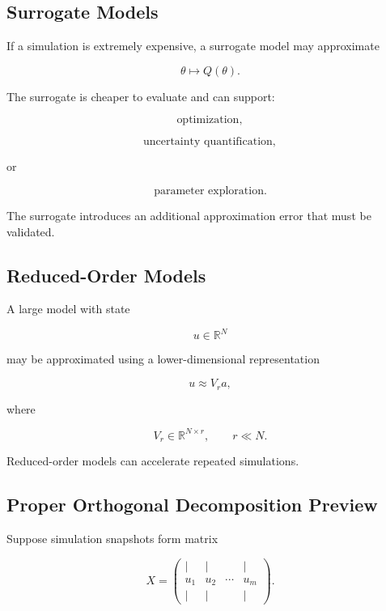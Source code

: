 \subsection{Surrogate Models}
\label{subsec:scientific-surrogate-models}

If a simulation is extremely expensive, a surrogate model may approximate

\[
\boxed{
\theta
\mapsto
Q(\theta).
}
\]

The surrogate is cheaper to evaluate and can support:

\[
\boxed{
\text{optimization},
}
\]

\[
\boxed{
\text{uncertainty quantification},
}
\]

or

\[
\boxed{
\text{parameter exploration}.
}
\]

The surrogate introduces an additional approximation error that must be
validated.

\subsection{Reduced-Order Models}
\label{subsec:reduced-order-models}

A large model with state

\[
u\in\mathbb{R}^N
\]

may be approximated using a lower-dimensional representation

\[
\boxed{
u
\approx
V_r a,
}
\]

where

\[
V_r
\in
\mathbb{R}^{N\times r},
\qquad
r\ll N.
\]

Reduced-order models can accelerate repeated simulations.

\subsection{Proper Orthogonal Decomposition Preview}
\label{subsec:pod-preview}

Suppose simulation snapshots form matrix

\[
\boxed{
X
=
\begin{pmatrix}
|&|&&|\\
u_1&u_2&\cdots&u_m\\
|&|&&|
\end{pmatrix}.
}
\]

